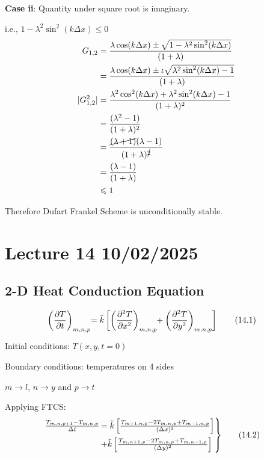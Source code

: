 \documentclass[fleqn,10pt]{SelfArx} %
\begin{document}
\textbf{Case ii}: Quantity under square root is imaginary.

i.e., $1-\lambda^2\sin^2(k\Delta x) \leqslant 0$
\begin{align*}
	G_{1,2} &= \frac{\lambda \cos(k\Delta x) \pm \sqrt{1 - \lambda^2\sin^2(k\Delta x)}}{(1+\lambda)} \\ 
	  &= \frac{\lambda \cos(k\Delta x) \pm \iota \sqrt{\lambda^2\sin^2(k\Delta x) - 1}}{(1+\lambda)} \\
	|G_{1,2}^2| &= \frac{\lambda^2 \cos^2(k\Delta x) + \lambda^2\sin^2(k\Delta x) - 1}{(1+\lambda)^2} \\ 
		    &= \frac{(\lambda^2 - 1)}{(1+\lambda)^2} \\
		    &= \frac{\cancel{(\lambda + 1)}(\lambda - 1)}{(1+\lambda)^{\cancel{2}}} \\
		    &= \frac{(\lambda - 1)}{(1+\lambda)} \\
		    &\leqslant 1
\end{align*}

Therefore Dufart Frankel Scheme is unconditionally stable.

\clearpage

\section{Lecture 14 10/02/2025}
\subsection{2-D Heat Conduction Equation}
\begin{align*}
	\left(\frac{\partial T}{\partial t}\right)_{\smash{m,n,p}} \mspace{-5mu} &= \tilde{k} \left[ \left(\frac{\partial^2 T}{\partial x^2}\right)_{\smash{m,n,p}} \mspace{-5mu} + \left(\frac{\partial^2 T}{\partial y^2}\right)_{\smash{m,n,p}} \right] \tag{14.1} \label{eq:2dheateq}
\end{align*}

Initial conditions: $T(x,y,t=0)$

Boundary conditions: temperatures on 4 sides

\(m \rightarrow l\), \(n \rightarrow y\) and \(p \rightarrow t\)

Applying FTCS:
\begin{align*}
	\begin{rcases}
		\frac{T_{m,n,p+1} - T_{m,n,p}}{\Delta t} \mspace{-15mu} &= \tilde{k}\left[\frac{T_{m+1,n,p} - 2T_{m,n,p} + T_{m-1,n,p}}{(\Delta x)^2}\right] \\ &+ \tilde{k}\left[\frac{T_{m,n+1,p} - 2T_{m,n,p} + T_{m,n-1,p}}{(\Delta y)^2}\right]
	\end{rcases} & \tag{14.2} \label{eq:14.2}
\end{align*}
\end{document}

